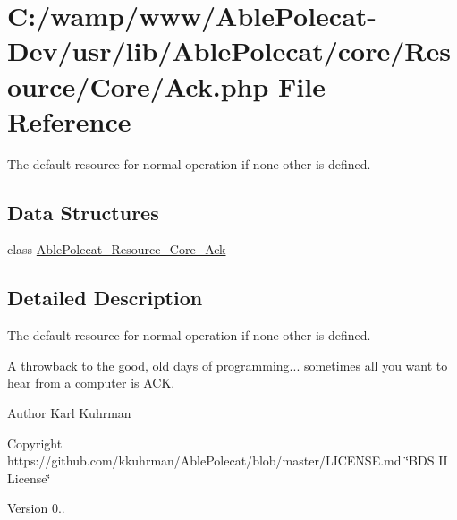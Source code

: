 \hypertarget{_ack_8php}{}\section{C\+:/wamp/www/\+Able\+Polecat-\/\+Dev/usr/lib/\+Able\+Polecat/core/\+Resource/\+Core/\+Ack.php File Reference}
\label{_ack_8php}


The default resource for normal operation if none other is defined.  


\subsection*{Data Structures}
\begin{DoxyCompactItemize}
\item 
class \hyperlink{class_able_polecat___resource___core___ack}{Able\+Polecat\+\_\+\+Resource\+\_\+\+Core\+\_\+\+Ack}
\end{DoxyCompactItemize}


\subsection{Detailed Description}
The default resource for normal operation if none other is defined. 

A throwback to the good, old days of programming... sometimes all you want to hear from a computer is A\+C\+K.

\begin{DoxyAuthor}{Author}
Karl Kuhrman 
\end{DoxyAuthor}
\begin{DoxyCopyright}{Copyright}
https\+://github.com/kkuhrman/\+Able\+Polecat/blob/master/\+L\+I\+C\+E\+N\+S\+E.\+md \char`\"{}\+B\+D\+S I\+I License\char`\"{} 
\end{DoxyCopyright}
\begin{DoxyVersion}{Version}
0.. 
\end{DoxyVersion}
